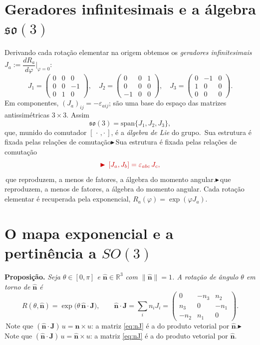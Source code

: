 \documentclass[12pt,a4paper]{article}   %
\newcommand{\nota}[1]{{\color{vermelho}%
  \ifmmode\blacktriangleright\,#1\else$\blacktriangleright$\,#1\fi}}
\newcommand{\R}{\mathbb{R}}
\newcommand{\so}{\mathfrak{so}}
\newcommand{\nvec}{\hat{\bm{n}}}          %
\newcommand{\Jvec}{\bm{J}}                %
\begin{document}
\section{Geradores infinitesimais e a \'algebra $\so(3)$}

Derivando cada rota\c{c}\~ao elementar na origem obtemos os
\emph{geradores infinitesimais} $J_a := \dfrac{dR_a}{d\varphi}\Big|_{\varphi=0}$:
\begin{equation}
J_1=\begin{pmatrix}0&0&0\\0&0&-1\\0&1&0\end{pmatrix},\quad
J_2=\begin{pmatrix}0&0&1\\0&0&0\\-1&0&0\end{pmatrix},\quad
J_3=\begin{pmatrix}0&-1&0\\1&0&0\\0&0&0\end{pmatrix}.
\end{equation}
Em componentes, $(J_a)_{ij}=-\varepsilon_{aij}$; s\~ao uma base do
espa\c{c}o das matrizes antissim\'etricas $3\times3$. Assim
\begin{equation}
\so(3)=\mathrm{span}\{J_1,J_2,J_3\},
\end{equation}
que, munido do comutador $[\,\cdot\,,\cdot\,]$, \'e a \emph{\'algebra de
Lie} do grupo. \nota{Sua estrutura \'e fixada pelas rela\c{c}\~oes de
comuta\c{c}\~ao}
\begin{equation}
\nota{[J_a,J_b]=\varepsilon_{abc}\,J_c,}
\label{eq:comm}
\end{equation}
\nota{que reproduzem, a menos de fatores, a \'algebra do momento angular.}
Cada rota\c{c}\~ao elementar \'e recuperada pela exponencial,
$R_a(\varphi)=\exp(\varphi J_a)$.

\section{O mapa exponencial e a pertin\^encia a $SO(3)$}

\noindent\textbf{Proposi\c{c}\~ao.} \emph{Seja $\theta\in[0,\pi]$ e
$\nvec\in\R^{3}$ com $\lVert\nvec\rVert=1$. A rota\c{c}\~ao de \^angulo
$\theta$ em torno de $\nvec$ \'e}
\begin{equation}
R(\theta,\nvec)=\exp\!\bigl(\theta\,\nvec\cdot\Jvec\bigr),
\qquad
\nvec\cdot\Jvec=\sum_i n_i J_i
=\begin{pmatrix}0&-n_3&n_2\\ n_3&0&-n_1\\ -n_2&n_1&0\end{pmatrix}.
\label{eq:nJ}
\end{equation}
\nota{Note que $(\nvec\cdot\Jvec)\,u=\nvec\times u$: a matriz
\eqref{eq:nJ} \'e a do produto vetorial por $\nvec$.}
\end{document}

